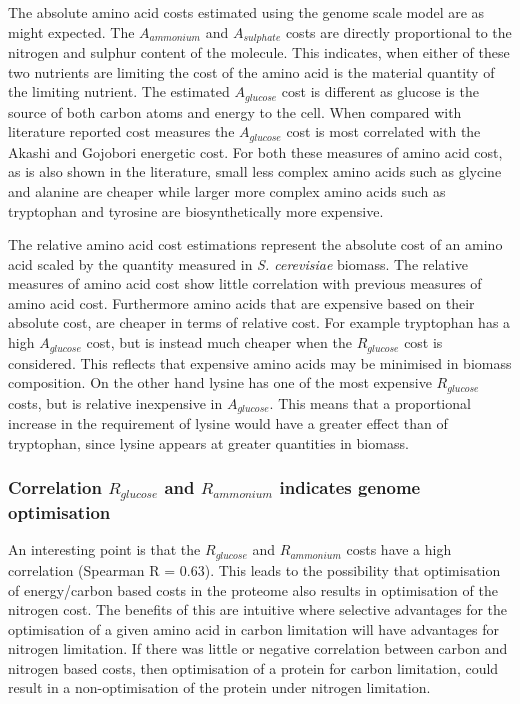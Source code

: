The absolute amino acid costs estimated using the genome scale model are as might expected. The $A_{ammonium}$ and $A_{sulphate}$ costs are directly proportional to the nitrogen and sulphur content of the molecule. This indicates, when either of these two nutrients are limiting the cost of the amino acid is the material quantity of the limiting nutrient. The estimated $A_{glucose}$ cost is different as glucose is the source of both carbon atoms and energy to the cell. When compared with literature reported cost measures the $A_{glucose}$ cost is most correlated with the Akashi and Gojobori energetic cost. For both these measures of amino acid cost, as is also shown in the literature, small less complex amino acids such as glycine and alanine are cheaper while larger more complex amino acids such as tryptophan and tyrosine are biosynthetically more expensive.

The relative amino acid cost estimations represent the absolute cost of an amino acid scaled by the quantity measured in \emph{S. cerevisiae} biomass. The relative measures of amino acid cost show little correlation with previous measures of amino acid cost. Furthermore amino acids that are expensive based on their absolute cost, are cheaper in terms of relative cost. For example tryptophan has a high $A_{glucose}$ cost, but is instead much cheaper when the $R_{glucose}$ cost is considered. This reflects that expensive amino acids may be minimised in biomass composition. On the other hand lysine has one of the most expensive $R_{glucose}$ costs, but is relative inexpensive in $A_{glucose}$. This means that a proportional increase in the requirement of lysine would have a greater effect than of tryptophan, since lysine appears at greater quantities in biomass.

\subsubsection{Correlation $R_{glucose}$ and $R_{ammonium}$ indicates genome optimisation}

An interesting point is that the $R_{glucose}$ and $R_{ammonium}$ costs have a high correlation (Spearman R = 0.63). This leads to the possibility that optimisation of energy/carbon based costs in the proteome also results in optimisation of the nitrogen cost. The benefits of this are intuitive where selective advantages for the optimisation of a given amino acid in carbon limitation will have advantages for nitrogen limitation. If there was little or negative correlation between carbon and nitrogen based costs, then optimisation of a protein for carbon limitation, could result in a non-optimisation of the protein under nitrogen limitation.

